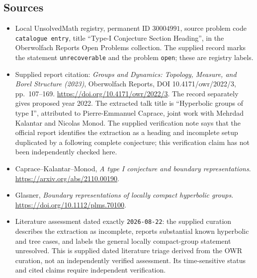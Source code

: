 \documentclass[11pt]{article}
\begin{document}
\subsection{Sources}
\begin{itemize}
\item Local UnsolvedMath registry, permanent ID \(30004991\), source problem code \texttt{catalogue entry}, title ``Type-I Conjecture Section Heading'', in the Oberwolfach Reports Open Problems collection. The supplied record marks the statement \texttt{unrecoverable} and the problem \texttt{open}; these are registry labels.
\item Supplied report citation: \emph{Groups and Dynamics: Topology, Measure, and Borel Structure (2023)}, Oberwolfach Reports, DOI 10.4171/owr/2022/3, pp.~107--169. \url{https://doi.org/10.4171/owr/2022/3}. The record separately gives proposed year 2022. The extracted talk title is ``Hyperbolic groups of type I'', attributed to Pierre-Emmanuel Caprace, joint work with Mehrdad Kalantar and Nicolas Monod. The supplied verification note says that the official report identifies the extraction as a heading and incomplete setup duplicated by a following complete conjecture; this verification claim has not been independently checked here.
\item Caprace--Kalantar--Monod, \emph{A type I conjecture and boundary representations}. \url{https://arxiv.org/abs/2110.00190}.
\item Glasner, \emph{Boundary representations of locally compact hyperbolic groups}. \url{https://doi.org/10.1112/plms.70100}.
\item Literature assessment dated exactly \texttt{2026-08-22}: the supplied curation describes the extraction as incomplete, reports substantial known hyperbolic and tree cases, and labels the general locally compact-group statement unresolved. This is supplied dated literature triage derived from the OWR curation, not an independently verified assessment. Its time-sensitive status and cited claims require independent verification.
\end{itemize}
\end{document}
